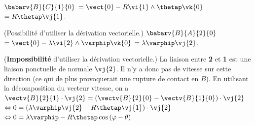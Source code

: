 \begin{corrigebox}
$\babarv{B}{C}{1}{0}$ 
$=\vect{0}-R\vi{1}\wedge\thetap\vk{0}$
$=R\thetap\vj{1}$.

(Possibilité d'utiliser la dérivation vectorielle.)
$\babarv{B}{A}{2}{0}$ 
$=\vect{0}-\lambda \vi{2}\wedge\varphip\vk{0}$
$=\lambda\varphip\vj{2}$.

(\textbf{Impossibilité} d'utiliser la dérivation vectorielle.)
La liaison entre \textbf{2} et \textbf{1} est une liaison ponctuelle de normale $\vj{2}$. Il n'y a donc pas de vitesse sur cette direction (ce qui de plus provoquerait une rupture de contact en $B$).
En utilisant la décomposition du vecteur vitesse, on a
$\vectv{B}{2}{1}\cdot \vj{2} =\left( \vectv{B}{2}{0} - \vectv{B}{1}{0}\right) \cdot \vj{2}$
$ \Leftrightarrow {0} =\left( \lambda\varphip\vj{2} - R\thetap\vj{1}\right) \cdot \vj{2}$
$ \Leftrightarrow {0} = \lambda\varphip - R\thetap \cos \left( \varphi - \theta\right)$
\end{corrigebox}
